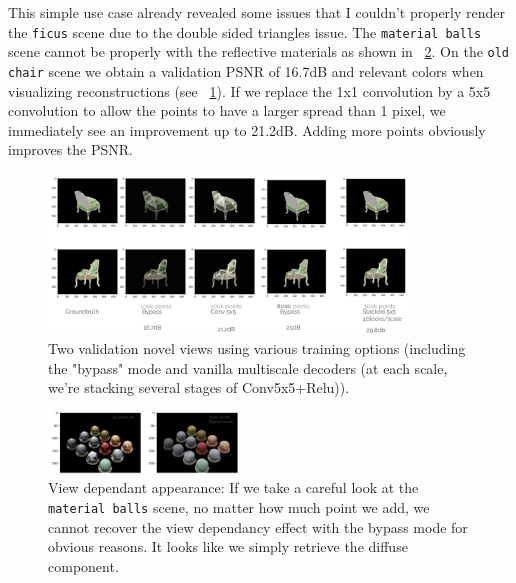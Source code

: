 This simple use case already revealed some issues that I couldn't properly render the \texttt{ficus} scene due to the double sided triangles issue. The \texttt{material balls} scene cannot be properly with the reflective materials as shown in ~\cref{fig:view_dependancy_issue}.
On the \texttt{old chair} scene we obtain a validation PSNR of 16.7dB and relevant colors when visualizing reconstructions (see ~\cref{fig:results_vanilla}). If we replace the 1x1 convolution by a 5x5 convolution to allow the points to have a larger spread than 1 pixel, we immediately see an improvement up to 21.2dB. Adding more points obviously improves the PSNR.


\begin{figure}[htpb]
    \centering
    \includegraphics[width=0.85\textwidth]{figures/qualitive_results_chair.png}
    \caption{Two validation novel views using various training options (including the "bypass" mode and vanilla multiscale decoders (at each scale, we're stacking several stages of  Conv5x5+Relu)).}
    \label{fig:results_vanilla}
\end{figure}



\begin{figure}[H]
    \centering
    \includegraphics[width=0.45\textwidth]{figures/view_dependancy_issue_mat_balls_arrow.png}
    \caption{View dependant appearance: If we take a careful look at the \texttt{material balls} scene, no matter how much point we add, we cannot recover the view dependancy effect with the bypass mode for obvious reasons. It looks like we simply retrieve the diffuse component. }
    \label{fig:view_dependancy_issue}
\end{figure}

